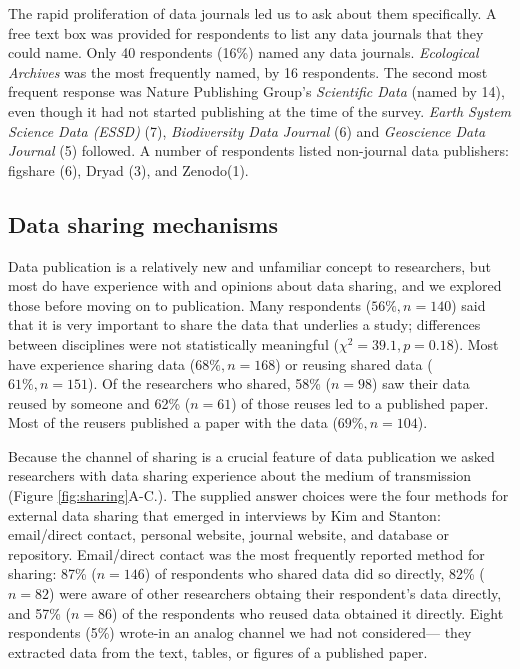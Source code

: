 \documentclass[10pt]{article}
\begin{document}
The rapid proliferation of data journals led us to ask about them specifically.
A free text box was provided for respondents to list any data journals that they could name.
Only 40 respondents (16\%) named any data journals. 
\emph{Ecological Archives} was the most frequently named, by 16 respondents. 
The second most frequent response was Nature Publishing Group's \emph{Scientific Data} (named by 14), even though it had not started publishing at the time of the survey.
\emph{Earth System Science Data (ESSD)} (7), \emph{Biodiversity Data Journal} (6) and \emph{Geoscience Data Journal} (5) followed.
A number of respondents listed non-journal data publishers: figshare (6), Dryad (3), and Zenodo(1).

\subsection*{Data sharing mechanisms}

Data publication is a relatively new and unfamiliar concept to researchers, but most do have experience with and opinions about data sharing, and we explored those before moving on to publication.
Many respondents ($56\%, n=140$) said that it is very important to share the data that underlies a study; differences between disciplines were not statistically meaningful ($\chi^{2}= 39.1, p= 0.18$). %
Most have experience sharing data ($68\%, n=168$) or reusing shared data ($61\%, n=151$).
Of the researchers who shared, 58\% ($n=98$) saw their data reused by someone and 62\% ($n=61$) of those reuses led to a published paper.
Most of the reusers published a paper with the data ($69\%, n=104$).

Because the channel of sharing is a crucial feature of data publication\cite{kratz_data_2014} we asked researchers with data sharing experience about the medium of transmission (Figure \ref{fig:sharing}A-C.).
The supplied answer choices were the four methods for external data sharing that emerged in interviews by Kim and Stanton: email/direct contact, personal website, journal website, and database or repository\cite{kim_institutional_2012}.
Email/direct contact was the most frequently reported method for sharing: 87\% ($n=146$) of respondents who shared data did so directly, 82\% ($n=82$) were aware of other researchers obtaing their respondent's data directly, and 57\% ($n=86$) of the respondents who reused data obtained it directly.
Eight respondents (5\%) wrote-in an analog channel we had not considered--- they extracted data from the text, tables, or figures of a published paper.
\end{document}
